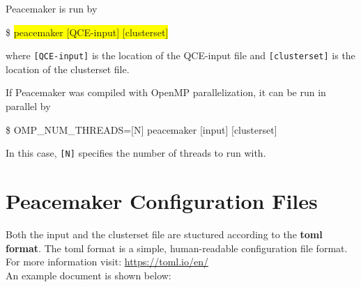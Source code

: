 \documentclass{scrartcl}
\newcommand{\amf}{a_\mathrm{mf}}
\newcommand{\bxv}{b_\mathrm{xv}}
\begin{document}
Peacemaker is run by
\begin{addmargin}[1cm]{0cm}
    \ttfamily
    \$ \colorbox{yellow}{peacemaker [QCE-input] [clusterset]}
\end{addmargin}
where \texttt{[QCE-input]} is the location of the QCE-input file and \texttt{[clusterset]} 
is the location of the clusterset file.

If Peacemaker was compiled with OpenMP parallelization, it can be run in parallel by
\begin{addmargin}[1cm]{0cm}
    \ttfamily
    \$ OMP\_NUM\_THREADS=[N] peacemaker [input] [clusterset]
\end{addmargin}
In this case, \texttt{[N]} specifies the number of threads to run with.

\newpage
%
%

\section{Peacemaker Configuration Files}
\label{sec:config}

Both the input and the clusterset file are stuctured according to the \textbf{toml format}.
The toml format is a simple, human-readable configuration file format.
For more information visit: \url{https://toml.io/en/}\\
An example document is shown below:
\end{document}
